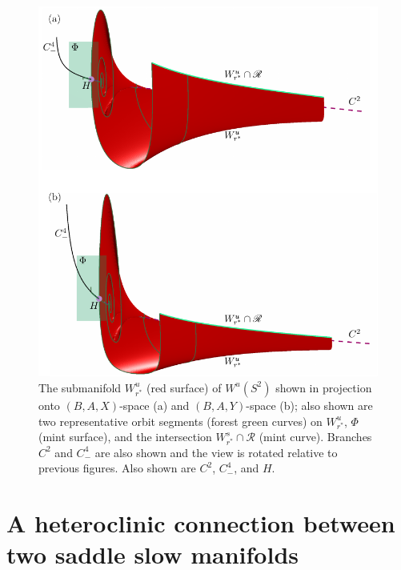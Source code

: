 \documentclass{ws-ijbc}
\begin{document}
\begin{figure}[H]
\centering
\includegraphics[]{./figures/MKMO_7.pdf}
\caption{The submanifold $W^u_{r^*}$ (red surface) of $W^u(S^2)$ shown in projection onto $(B,A,X)$-space (a) and $(B,A,Y)$-space (b); also shown are two representative orbit segments (forest green curves) on $W^u_{r^*}$, $\Phi$ (mint surface), and the intersection $W^s_{r^*}\cap\mathscr{R}$ (mint curve).  Branches $C^2$ and $C^4_-$ are also shown and the view is rotated relative to previous figures.  Also shown are $C^2$, $C^4_-$, and $H$.}
\label{unstable_piece}
\end{figure}



\section{A heteroclinic connection between two saddle slow manifolds}
\end{document}
